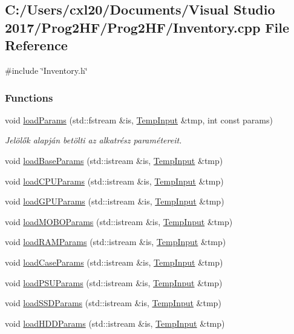 \subsection{C\+:/\+Users/cxl20/\+Documents/\+Visual Studio 2017/\+Prog2\+H\+F/\+Prog2\+H\+F/\+Inventory.cpp File Reference}
\label{_inventory_8cpp}
{\ttfamily \#include \char`\"{}Inventory.\+h\char`\"{}}\newline
\subsubsection*{Functions}
\begin{DoxyCompactItemize}
\item 
void \mbox{\hyperlink{_inventory_8cpp_acecc59385cd8970fe6e368ea592362be}{load\+Params}} (std\+::fstream \&is, \mbox{\hyperlink{struct_temp_input}{Temp\+Input}} \&tmp, int const params)
\begin{DoxyCompactList}\small\item\em Jelölők alapján betölti az alkatrész paramétereit. \end{DoxyCompactList}\item 
void \mbox{\hyperlink{_inventory_8cpp_af88785d286c8ea9392930b904f687672}{load\+Base\+Params}} (std\+::istream \&is, \mbox{\hyperlink{struct_temp_input}{Temp\+Input}} \&tmp)
\item 
void \mbox{\hyperlink{_inventory_8cpp_a0565beb9b5429fe7cf6edcb88becc168}{load\+C\+P\+U\+Params}} (std\+::istream \&is, \mbox{\hyperlink{struct_temp_input}{Temp\+Input}} \&tmp)
\item 
void \mbox{\hyperlink{_inventory_8cpp_aa795cbf45c10e4533a23961614749d05}{load\+G\+P\+U\+Params}} (std\+::istream \&is, \mbox{\hyperlink{struct_temp_input}{Temp\+Input}} \&tmp)
\item 
void \mbox{\hyperlink{_inventory_8cpp_ab92e8bf2c22b5df04897f18e888d7973}{load\+M\+O\+B\+O\+Params}} (std\+::istream \&is, \mbox{\hyperlink{struct_temp_input}{Temp\+Input}} \&tmp)
\item 
void \mbox{\hyperlink{_inventory_8cpp_aec5377baa2a6064a69b04423103d85ea}{load\+R\+A\+M\+Params}} (std\+::istream \&is, \mbox{\hyperlink{struct_temp_input}{Temp\+Input}} \&tmp)
\item 
void \mbox{\hyperlink{_inventory_8cpp_a47e65a05879001febd45f541ab230b86}{load\+Case\+Params}} (std\+::istream \&is, \mbox{\hyperlink{struct_temp_input}{Temp\+Input}} \&tmp)
\item 
void \mbox{\hyperlink{_inventory_8cpp_a198252da076147a0ef1f4d721bdb2219}{load\+P\+S\+U\+Params}} (std\+::istream \&is, \mbox{\hyperlink{struct_temp_input}{Temp\+Input}} \&tmp)
\item 
void \mbox{\hyperlink{_inventory_8cpp_ac358a7371dcac8ed9d7aba003099c193}{load\+S\+S\+D\+Params}} (std\+::istream \&is, \mbox{\hyperlink{struct_temp_input}{Temp\+Input}} \&tmp)
\item 
void \mbox{\hyperlink{_inventory_8cpp_ab09373672ea8d4ea19f1903344fe327a}{load\+H\+D\+D\+Params}} (std\+::istream \&is, \mbox{\hyperlink{struct_temp_input}{Temp\+Input}} \&tmp)
\end{DoxyCompactItemize}


